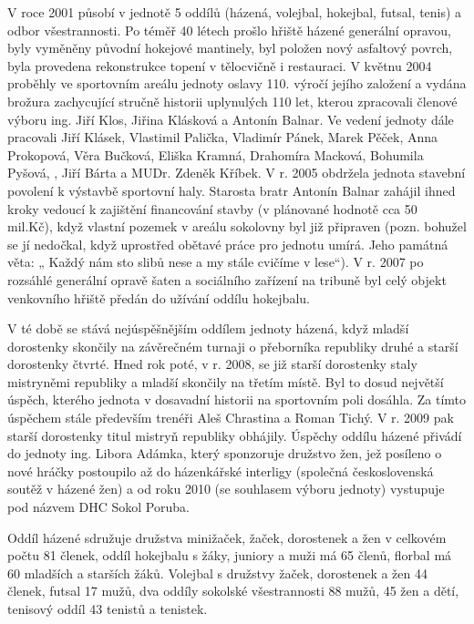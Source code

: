 \documentclass[openany]{report}
\begin{document}
V roce 2001 působí v jednotě 5 oddílů (házená, volejbal, hokejbal, futsal, tenis) a odbor všestrannosti. Po téměř 40 létech prošlo hřiště házené generální opravou, byly vyměněny původní hokejové mantinely, byl položen nový asfaltový povrch, byla provedena rekonstrukce topení v tělocvičně i restauraci.  V květnu 2004 proběhly ve sportovním areálu jednoty oslavy 110. výročí jejího založení a vydána brožura zachycující stručně historii uplynulých 110 let, kterou zpracovali členové výboru ing. Jiří Klos, Jiřina Klásková a Antonín Balnar. Ve vedení jednoty dále pracovali Jiří Klásek, Vlastimil Palička, Vladimír Pánek, Marek Pěček, Anna Prokopová, Věra Bučková, Eliška Kramná, Drahomíra Macková, Bohumila Pyšová, , Jiří Bárta a MUDr. Zdeněk Kříbek. V r. 2005 obdržela jednota stavební povolení k výstavbě sportovní haly. Starosta bratr Antonín Balnar zahájil ihned kroky vedoucí k zajištění financování stavby (v plánované hodnotě cca 50 mil.Kč), když vlastní pozemek v areálu sokolovny byl již připraven (pozn. bohužel se jí nedočkal, když uprostřed obětavé práce pro jednotu umírá. Jeho památná věta: „ Každý nám sto slibů nese a my stále cvičíme v lese“). V r. 2007 po rozsáhlé generální opravě šaten a sociálního zařízení na tribuně byl celý objekt venkovního hřiště předán do užívání oddílu hokejbalu.  

V té době se stává nejúspěšnějším oddílem jednoty házená, když mladší dorostenky skončily na závěrečném turnaji o přeborníka republiky druhé a starší dorostenky čtvrté. Hned rok poté, v r. 2008, se již starší dorostenky staly mistryněmi republiky a mladší skončily na třetím místě.  Byl to dosud největší úspěch, kterého jednota v dosavadní historii na sportovním poli dosáhla. Za tímto úspěchem stále především trenéři Aleš Chrastina a Roman Tichý. V r. 2009 pak starší dorostenky titul mistryň republiky obhájily. Úspěchy oddílu házené přivádí do jednoty ing. Libora Adámka, který sponzoruje družstvo žen, jež posíleno o nové hráčky postoupilo až do házenkářské interligy (společná československá soutěž v házené žen) a od roku 2010 (se souhlasem výboru jednoty) vystupuje pod názvem DHC Sokol Poruba. 

Oddíl házené sdružuje družstva minižaček, žaček, dorostenek a žen v celkovém počtu 81 členek, oddíl hokejbalu s žáky, juniory a muži má 65 členů, florbal má 60 mladších a starších žáků. Volejbal s družstvy žaček, dorostenek a žen 44 členek, futsal 17 mužů, dva oddíly sokolské všestrannosti 88 mužů, 45 žen a dětí, tenisový oddíl 43 tenistů a tenistek.
\end{document}

